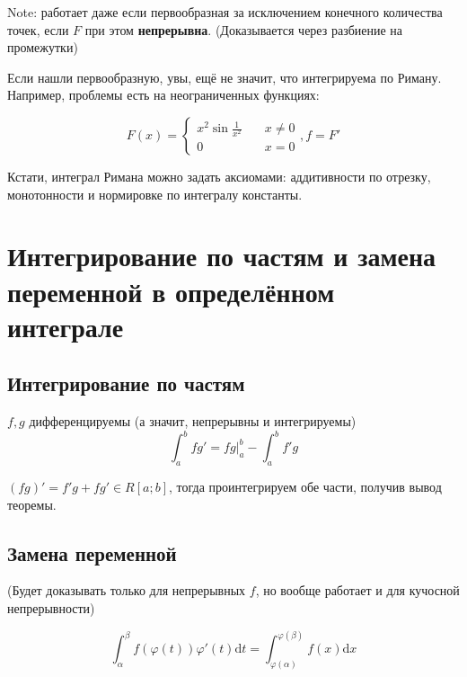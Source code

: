 \documentclass[12pt, a4paper]{article}
\begin{document}
    \splitdoc

    Note: работает даже если первообразная за исключением конечного количества точек, если $F$ при этом \textbf{непрерывна}. (Доказывается через разбиение на промежутки)

    Если нашли первообразную, увы, ещё не значит, что интегрируема по Риману. Например, проблемы есть на неограниченных функциях:

    \begin{equation}
        F(x) = \begin{cases}
            x^2 \sin \frac{1}{x^2} &\quad x \neq 0 \\
            0 &\quad x = 0
        \end{cases}, f = F'
    \end{equation}

    Кстати, интеграл Римана можно задать аксиомами: аддитивности по отрезку, монотонности и нормировке по интегралу константы.


\section{Интегрирование по частям и замена переменной в определённом интеграле}

\subsection{Интегрирование по частям}

    $f, g$ дифференцируемы (а значит, непрерывны и интегрируемы)
    \begin{equation}
        \int^b_a f g' = fg |^b_a - \int^b_a f' g
    \end{equation}

    $(fg)' = f'g + fg' \in R[a;b]$, тогда проинтегрируем обе части, получив вывод теоремы.


\subsection{Замена переменной}

    (Будет доказывать только для непрерывных $f$, но вообще работает и для кучосной непрерывности)

    \begin{equation}
        \int^\beta_\alpha f(\varphi(t)) \varphi'(t) \mathrm{d}t = \int^{\varphi(\beta)}_{\varphi(\alpha)} f(x) \mathrm{d}x
    \end{equation}
\end{document}
